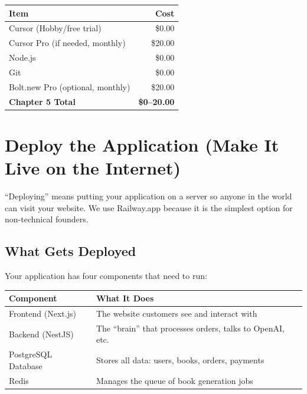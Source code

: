 \documentclass[12pt, letterpaper, oneside]{book}
\begin{document}
\begin{table}[H]
\centering
\begin{tabular}{lr}
\toprule
\textbf{Item} & \textbf{Cost} \\
\midrule
Cursor (Hobby/free trial) & \$0.00 \\
Cursor Pro (if needed, monthly) & \$20.00 \\
Node.js & \$0.00 \\
Git & \$0.00 \\
Bolt.new Pro (optional, monthly) & \$20.00 \\
\midrule
\textbf{Chapter 5 Total} & \textbf{\$0--20.00} \\
\bottomrule
\end{tabular}
\end{table}


\chapter{Deploy the Application (Make It Live on the Internet)}

``Deploying'' means putting your application on a server so anyone in the world can visit your website. We use Railway.app because it is the simplest option for non-technical founders.

\section{What Gets Deployed}

Your application has four components that need to run:

\begin{table}[H]
\centering
\begin{tabularx}{\textwidth}{lX}
\toprule
\textbf{Component} & \textbf{What It Does} \\
\midrule
Frontend (Next.js) & The website customers see and interact with \\
Backend (NestJS) & The ``brain'' that processes orders, talks to OpenAI, etc. \\
PostgreSQL Database & Stores all data: users, books, orders, payments \\
Redis & Manages the queue of book generation jobs \\
\bottomrule
\end{tabularx}
\end{table}
\end{document}
